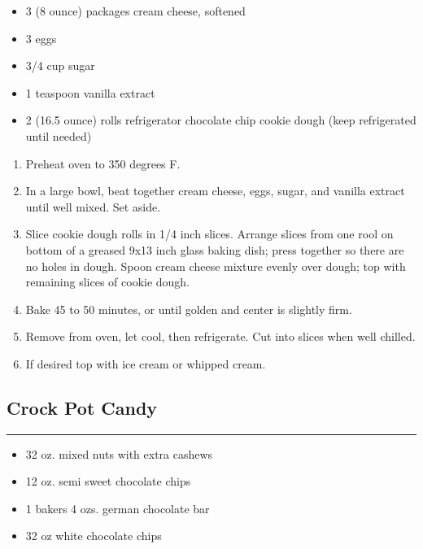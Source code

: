 \documentclass{article}
\begin{document}
\begin{framed}
\begin{itemize}
    \item 3 (8 ounce) packages cream cheese, softened
    \item 3 eggs
    \item 3/4 cup sugar
    \item 1 teaspoon vanilla extract
    \item 2 (16.5 ounce) rolls refrigerator chocolate chip cookie dough (keep refrigerated until needed)
\end{itemize}
\end{framed}

\begin{enumerate}
    \item 
        Preheat oven to 350 degrees F.
    \item 
        In a large bowl, beat together cream cheese, eggs, sugar, and vanilla extract until well mixed. Set aside.
    \item 
        Slice cookie dough rolls in 1/4 inch slices. Arrange slices from one rool on bottom of a greased 9x13 inch glass baking dish; press together so there are no holes in dough. Spoon cream cheese mixture evenly over dough; top with remaining slices of cookie dough.
    \item 
        Bake 45 to 50 minutes, or until golden and center is slightly firm.
    \item 
        Remove from oven, let cool, then refrigerate. Cut into slices when well chilled.
    \item 
        If desired top with ice cream or whipped cream.
\end{enumerate}
\newpage

\subsection{Crock Pot Candy} 
\noindent\rule[0.5ex]{\linewidth}{1pt}

\begin{framed}
    \begin{itemize}
        \item 32 oz. mixed nuts with extra cashews 
        \item 12 oz. semi sweet chocolate chips 
        \item 1 bakers 4 ozs. german chocolate bar
        \item 32 oz white chocolate chips
    \end{itemize}
\end{framed}
\end{document}
